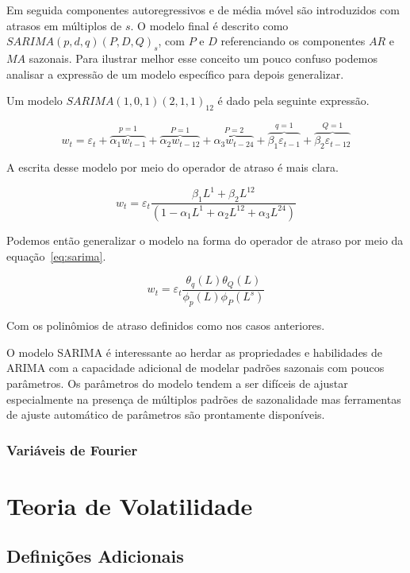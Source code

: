 Em seguida componentes autoregressivos e de média móvel são introduzidos com
atrasos em múltiplos de $s$. O modelo final é descrito como $SARIMA(p, d, q)
(P, D, Q)_{s}$, com $P$ e $D$ referenciando os componentes $AR$ e $MA$
sazonais. Para ilustrar melhor esse conceito um pouco confuso podemos analisar a
expressão de um modelo específico para depois generalizar.

Um modelo $SARIMA(1, 0, 1)(2, 1, 1)_{12}$ é dado pela seguinte expressão.

$$ w_t = \varepsilon_t + \overbrace{\alpha_1 w_{t-1}}^{p = 1} + \overbrace{
\alpha_2 w_{t-12}}^{P=1} + \overbrace{\alpha_3 w_{t-24}}^{P=2} +
\overbrace{\beta_1 \varepsilon_{t-1}}^{q=1} + \overbrace{\beta_2
\varepsilon_{t-12}}^{Q=1}$$

A escrita desse modelo por meio do operador de atraso é mais clara.

$$  w_t = \varepsilon_t \frac{\beta_1 L^1 + \beta_2 L^{12}}{(1 - \alpha_1 L^1 + \alpha_2 L^{12} + \alpha_3 L^{24})}  $$

Podemos então generalizar o modelo na forma do operador de atraso por meio da
equação~\ref{eq:sarima}.

\begin{equation}\label{eq:sarima}
    w_t = \varepsilon_{t} \frac{\theta_q(L)\theta_Q(L)}{\phi_p (L) \phi_P (L^s)}
\end{equation}

Com os polinômios de atraso definidos como nos casos anteriores.

O modelo SARIMA é interessante ao herdar as propriedades e habilidades de
ARIMA com a capacidade adicional de modelar padrões sazonais com poucos
parâmetros. Os parâmetros do modelo tendem a ser difíceis de ajustar
especialmente na presença de múltiplos padrões de sazonalidade mas ferramentas
de ajuste automático de parâmetros são prontamente disponíveis.

\subsection{Variáveis de Fourier}

\chapter{Teoria de Volatilidade}
\label{sec:volatility_theory}

\section{Definições Adicionais}

